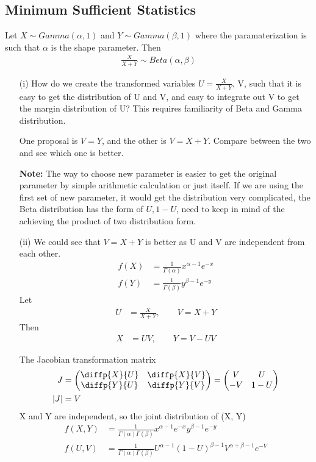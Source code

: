 \subsection{Minimum Sufficient Statistics}
Let $X \sim Gamma(\alpha, 1)$ and $Y \sim Gamma(\beta, 1)$ where the paramaterization is such that $\alpha$ is the shape parameter. Then 
\begin{align*}
	\frac{X}{X+Y} \sim Beta(\alpha, \beta)
\end{align*}

\begin{itemize}
	\item [(i)] How do we create the transformed variables $U= \frac{X}{X+Y} $, V, such that it is easy to get the distribution of U and V, and easy to integrate out V to get the margin distribution of U? This requires familiarity of Beta and Gamma distribution.
	
	One proposal is $V= Y$, and the other is $V= X+Y$. Compare between the two and see which one is better.
	
	\textbf{Note:} The way to choose new parameter is easier to get the original parameter by simple arithmetic calculation or just itself.
	If we are using the first set of new parameter, it would get the distribution very complicated, the Beta distribution has the form of $U, 1-U$, need to keep in mind of the achieving the product of two distribution form. 
	
	\item[(ii)] We could see that $V=X+Y$ is better as U and V are independent from each other.
\begin{align*}
	f(X) &= \frac{1}{\Gamma{(\alpha)}} x^{\alpha-1} e^{-x}\\
	f(Y) &= \frac{1}{\Gamma{(\beta)}} y^{\beta-1} e^{-y}
\end{align*}	
Let
\begin{align*}
	U &= \frac{X}{X+Y}, \qquad V = X + Y
\end{align*}	
Then
\begin{align*}
	X &= UV, \qquad Y = V - UV
\end{align*}
	 	
The Jacobian transformation matrix
\begin{align*}
	J &= \begin{pmatrix}
		\diffp{X}{U} & \diffp{X}{V} \\
		\diffp{Y}{U} & \diffp{Y}{V} 
	\end{pmatrix} =  \begin{pmatrix}
	V & U \\
	-V & 1-U
\end{pmatrix}\\
|J| &= V
\end{align*}
X and Y are independent, so the joint distribution of (X, Y) 
\begin{align*}
	f(X, Y) &= \frac{1}{\Gamma{(\alpha)} \Gamma{(\beta)}} x^{\alpha -1} e^{-x} y^{\beta -1} e^{-y}\\
	f(U, V) &= \frac{1}{\Gamma{(\alpha)} \Gamma{(\beta)}} U^{\alpha -1} (1-U)^{\beta -1} V^{\alpha + \beta -1} e^{-V}
\end{align*}


\end{itemize}
